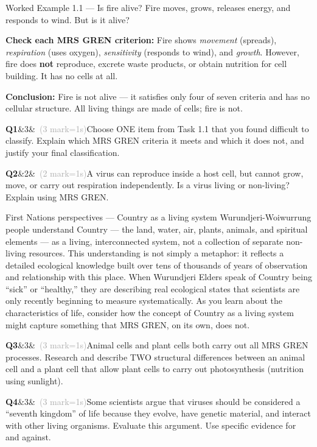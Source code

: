 \documentclass[11pt,a4paper]{article}
\newcommand{\answerbox}[1]{%
  \begin{tcolorbox}[
    enhanced, breakable, arc=2mm,
    colback=Paper, colframe=Line,
    left=2mm, right=2mm, top=1mm, bottom=1mm,
    boxrule=1pt,
    height=#1
  ]
  \end{tcolorbox}%
}
\newcommand{\question}[3]{%
  \needspace{3\baselineskip}%
  \medskip
  \noindent\textbf{Q#1}\ifx&#2&\else\ \textcolor{DarkGrey}{(#2 mark\ifnum#2=1\else s\fi)}\fi\quad #3%
  \medskip
}
\begin{document}
\begin{workedex}{Worked Example 1.1 --- Is fire alive?}
Fire moves, grows, releases energy, and responds to wind. But is it alive?

\medskip
\textbf{Check each MRS GREN criterion:} Fire shows \textit{movement} (spreads), \textit{respiration} (uses oxygen), \textit{sensitivity} (responds to wind), and \textit{growth}. However, fire does \textbf{not} reproduce, excrete waste products, or obtain nutrition for cell building. It has no cells at all.

\textbf{Conclusion:} Fire is not alive --- it satisfies only four of seven criteria and has no cellular structure. All living things are made of cells; fire is not.
\end{workedex}

\begin{yr7box}
\question{1}{3}{Choose ONE item from Task 1.1 that you found difficult to classify. Explain which MRS GREN criteria it meets and which it does not, and justify your final classification.}
\answerbox{4cm}

\question{2}{2}{A virus can reproduce inside a host cell, but cannot grow, move, or carry out respiration independently. Is a virus living or non-living? Explain using MRS GREN.}
\answerbox{3.5cm}
\end{yr7box}

\begin{fnbox}{First Nations perspectives --- Country as a living system}
Wurundjeri-Woiwurrung people understand Country --- the land, water, air, plants, animals, and spiritual elements --- as a living, interconnected system, not a collection of separate non-living resources. This understanding is not simply a metaphor: it reflects a detailed ecological knowledge built over tens of thousands of years of observation and relationship with this place. When Wurundjeri Elders speak of Country being ``sick'' or ``healthy,'' they are describing real ecological states that scientists are only recently beginning to measure systematically. As you learn about the characteristics of life, consider how the concept of Country as a living system might capture something that MRS GREN, on its own, does not.
\end{fnbox}

\begin{yr8box}
\question{3}{3}{Animal cells and plant cells both carry out all MRS GREN processes. Research and describe TWO structural differences between an animal cell and a plant cell that allow plant cells to carry out photosynthesis (nutrition using sunlight).}
\answerbox{4cm}

\question{4}{3}{Some scientists argue that viruses should be considered a ``seventh kingdom'' of life because they evolve, have genetic material, and interact with other living organisms. Evaluate this argument. Use specific evidence for and against.}
\answerbox{4cm}
\end{yr8box}
\end{document}
